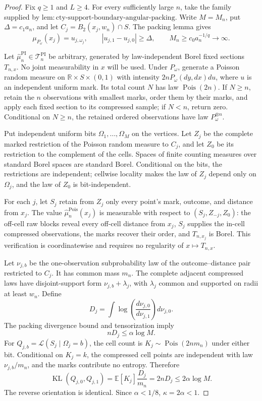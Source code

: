 \documentclass{article}
\begin{document}
\begin{proof}
Fix \(q\geq1\) and \(L\geq4\).  For every sufficiently large \(n\), take the family supplied by \(\mathrm{lem:cty\text{-}support\text{-}boundary\text{-}angular\text{-}packing}\).  Write \(M=M_n\), put \(\Delta=c_1a_n\), and let \(C_j=B_2(x_j,w_n)\cap S\).  The packing lemma gives
\[
 \mu_{P_\omega}(x_j)=u_{j,\omega_j},
 \qquad |u_{j,1}-u_{j,0}|\geq\Delta,
 \qquad M_n\geq c_0a_n^{-1/q}\longrightarrow\infty.
\]

Let \(\widehat\mu_n^{\mathrm{PI}}\in\mathcal T_n^{\mathrm{PI}}\) be arbitrary, generated by law-independent Borel fixed sections \(T_{n,x}\).  No joint measurability in \(x\) will be used.  Under \(P_\omega\), generate a Poisson random measure on \(\mathbb R\times S\times(0,1)\) with intensity \(2nP_\omega(dy,dx)du\), where \(u\) is an independent uniform mark.  Its total count \(N\) has law \(\operatorname{Pois}(2n)\).  If \(N\geq n\), retain the \(n\) observations with smallest marks, order them by their marks, and apply each fixed section to its compressed sample; if \(N<n\), return zero.  Conditional on \(N\geq n\), the retained ordered observations have law \(P_\omega^{\otimes n}\).

Put independent uniform bits \(\Omega_1,\ldots,\Omega_M\) on the vertices.  Let \(Z_j\) be the complete marked restriction of the Poisson random measure to \(C_j\), and let \(Z_0\) be its restriction to the complement of the cells.  Spaces of finite counting measures over standard Borel spaces are standard Borel.  Conditional on the bits, the restrictions are independent; cellwise locality makes the law of \(Z_j\) depend only on \(\Omega_j\), and the law of \(Z_0\) is bit-independent.

For each \(j\), let \(S_j\) retain from \(Z_j\) only every point's mark, outcome, and distance from \(x_j\).  The value \(\widehat\mu_n^{\mathrm{Pois}}(x_j)\) is measurable with respect to \((S_j,Z_{-j},Z_0)\): the off-cell raw blocks reveal every off-cell distance from \(x_j\), \(S_j\) supplies the in-cell compressed observations, the marks recover their order, and \(T_{n,x_j}\) is Borel.  This verification is coordinatewise and requires no regularity of \(x\mapsto T_{n,x}\).

Let \(\nu_{j,b}\) be the one-observation subprobability law of the outcome--distance pair restricted to \(C_j\).  It has common mass \(m_n\).  The complete adjacent compressed laws have disjoint-support form \(\nu_{j,b}+\lambda_j\), with \(\lambda_j\) common and supported on radii at least \(w_n\).  Define
\[
 D_j=\int\log\!\left(\frac{d\nu_{j,0}}{d\nu_{j,1}}\right)d\nu_{j,0}.
\]
The packing divergence bound and tensorization imply
\[
 nD_j\leq\alpha\log M.
\]
For \(Q_{j,b}=\mathcal L(S_j\mid\Omega_j=b)\), the cell count is \(K_j\sim\operatorname{Pois}(2nm_n)\) under either bit.  Conditional on \(K_j=k\), the compressed cell points are independent with law \(\nu_{j,b}/m_n\), and the marks contribute no entropy.  Therefore
\[
 \operatorname{KL}(Q_{j,0},Q_{j,1})
 =\mathbb E[K_j]\frac{D_j}{m_n}
 =2nD_j
 \leq2\alpha\log M.
\]
The reverse orientation is identical.  Since \(\alpha<1/8\), \(\kappa=2\alpha<1\).


\end{proof}
\end{document}
